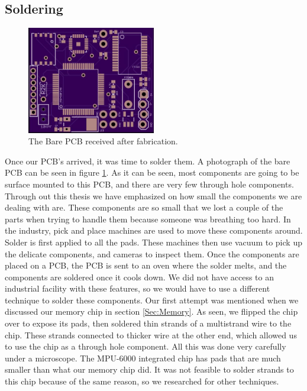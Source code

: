 \subsection{Soldering}
\label{Sec:Soldering}
\begin{figure}
\begin{center}
\includegraphics[width=0.5\textwidth]{images/PCBBare.jpg}
\caption{The Bare PCB received after fabrication.}
\label{Fig:PCBBare}
\end{center}
\end{figure}
Once our PCB's arrived, it was time to solder them.
A photograph of the bare PCB can be seen in figure \ref{Fig:PCBBare}.
As it can be seen,
most components are going to be surface mounted to this PCB,
and there are very few through hole components.
Through out this thesis we have emphasized on how small the components we are dealing with are.
These components are so small that we lost a couple of the parts when trying to handle them because someone was breathing too hard.
In the industry,
pick and place machines are used to move these components around.
Solder is first applied to all the pads.
These machines then use vacuum to pick up the delicate components,
and cameras to inspect them. 
Once the components are placed on a PCB,
the PCB is sent to an oven where the solder melts,
and the components are soldered once it cools down.
We did not have access to an industrial facility with these features,
so we would have to use a different technique to solder these components.
Our first attempt was mentioned when we discussed our memory chip in section \ref{Sec:Memory}.
As seen, we flipped the chip over to expose its pads,
then soldered thin strands of a multistrand wire to the chip.
These strands connected to thicker wire at the other end,
which allowed us to use the chip as a through hole component.
All this was done very carefully under a microscope.
The MPU-6000 integrated chip has pads that are much smaller than what our memory chip did.
It was not feasible to solder strands to this chip because of the same reason,
so we researched for other techniques.

